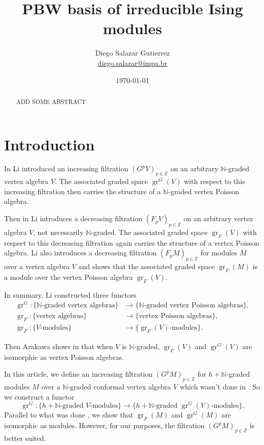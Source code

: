 \documentclass[12pt, a4paper]{article}
\DeclareMathOperator{\gr}{gr}
\begin{document}
\title{PBW basis of irreducible Ising modules}
\author{Diego Salazar Gutierrez \\ \href{mailto:diego.salazar@impa.br}{diego.salazar@impa.br}}
\date{\today}
\maketitle

\begin{abstract}
  ADD SOME ABSTRACT
\end{abstract}

\section{Introduction}
\label{sec:introduction}

In \cite{li_vertex_2004} Li introduced an increasing filtration $(G^pV)_{p\in \mathbb{Z}}$ on an arbitrary $\mathbb{N}$-graded vertex algebra $V$.
The associated graded space $\gr^G(V)$ with respect to this increasing filtration then carries the structure of a $\mathbb{N}$-graded vertex Poisson algebra.

Then in \cite{li_abelianizing_2005} Li introduces a decreasing filtration $(F_pV)_{p\in \mathbb{Z}}$ on an arbitrary vertex algebra $V$, not necessarily $\mathbb{N}$-graded.
The associated graded space $\gr_F(V)$ with respect to this decreasing filtration again carries the structure of a vertex Poisson algebra.
Li also introduces a decreasing filtration $(F_pM)_{p\in \mathbb{Z}}$ for modules $M$ over a vertex algebra $V$ and shows that the associated graded space $\gr_F(M)$ is a module over the vertex Poisson algebra $\gr_F(V)$.

In summary, Li constructed three functors
\begin{align*}
  \gr^G: \{\text{$\mathbb{N}$-graded vertex algebras}\} &\to \{\text{$\mathbb{N}$-graded vertex Poisson algebras}\}, \\
  \gr_F: \{\text{vertex algebras}\} &\to \{\text{vertex Poisson algebras}\}, \\
  \gr_F: \{\text{$V$-modules}\} &\to \{\text{$\gr_F(V)$-modules}\}.
\end{align*}

Then Arakawa shows in \cite[Proposition 2.6.1]{arakawa_remark_2012} that when $V$ is $\mathbb{N}$-graded, $\gr_F(V)$ and $\gr^G(V)$ are isomorphic as vertex Poisson algebras.

In this article, we define an increasing filtration $(G^pM)_{p\in \mathbb{Z}}$ for $h + \mathbb{N}$-graded modules $M$ over a $\mathbb{N}$-graded conformal vertex algebra $V$ which wasn't done in \cite{li_vertex_2004}.
So we construct a functor
\begin{equation*}
  \gr^G: \{\text{$h + \mathbb{N}$-graded $V$-modules}\} \to \{\text{$h+\mathbb{N}$-graded $\gr^G(V)$-modules}\}.
\end{equation*}
Parallel to what was done \cite{arakawa_remark_2012}, we show that $\gr_F(M)$ and $\gr^G(M)$ are isomorphic as modules.
However, for our purposes, the filtration $(G^pM)_{p\in \mathbb{Z}}$ is better suited.
\end{document}
